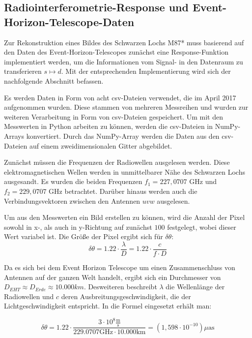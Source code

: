 \subsection{Radiointerferometrie-Response und Event-Horizon-Telescope-Daten}

Zur Rekonstruktion eines Bildes des Schwarzen Lochs M87* muss basierend auf den Daten des Event-Horizon-Telescopes zunächst eine Response-Funktion implementiert werden, um die Informationen vom Signal- in den Datenraum zu transferieren $s \mapsto d$. Mit der entsprechenden Implementierung wird sich der nachfolgende Abschnitt befassen.

Es werden Daten in Form von acht csv-Dateien verwendet, die im April 2017 aufgenommen wurden. Diese stammen von mehreren Messreihen und wurden zur weiteren Verarbeitung in Form von csv-Dateien gespeichert.
Um mit den Messwerten in Python arbeiten zu können, werden die csv-Dateien in NumPy-Arrays konvertiert. Durch das NumPy-Array werden die Daten aus den csv-Dateien auf einem zweidimensionalen Gitter abgebildet.

Zunächst müssen die Frequenzen der Radiowellen ausgelesen werden. Diese elektromagnetischen Wellen werden in unmittelbarer Nähe des Schwarzen Lochs ausgesandt. Es wurden die beiden Frequenzen $f_1 = 227,0707$ GHz und $f_2 = 229,0707$ GHz betrachtet. Darüber hinaus werden auch die Verbindungsvektoren zwischen den Antennen $uvw$ ausgelesen.

Um aus den Messwerten ein Bild erstellen zu können, wird die Anzahl der Pixel sowohl in x-, als auch in y-Richtung auf zunächst $100$ festgelegt, wobei dieser Wert variabel ist. Die Größe der Pixel ergibt sich für $\delta \theta$:
\[ \delta \theta = 1.22 \cdot \displaystyle\frac{\lambda}{D} = 1.22 \cdot \displaystyle\frac{c}{f \cdot D} \]

Da es sich bei dem Event Horizon Telescope um einen Zusammenschluss von Antennen auf der ganzen Welt handelt, ergibt sich ein Durchmesser von $D_{EHT} \approx D_{Erde} \approx 10.000km$. Desweiteren beschreibt $\lambda$ die Wellenlänge der Radiowellen und $c$ deren Ausbreitungsgeschwindigkeit, die der Lichtgeschwindigkeit entspricht. In die Formel eingesetzt erhält man:

\begin{equation}
  \delta \theta = 1.22 \cdot \displaystyle\frac{3 \cdot 10^{8} \displaystyle\frac{\text{m}}{\text{s}}} {229.0707 \text{GHz} \cdot 10.000 \text{km}} = (1,598 \cdot 10^{-10}) \mu \text{as} 
\end{equation}

